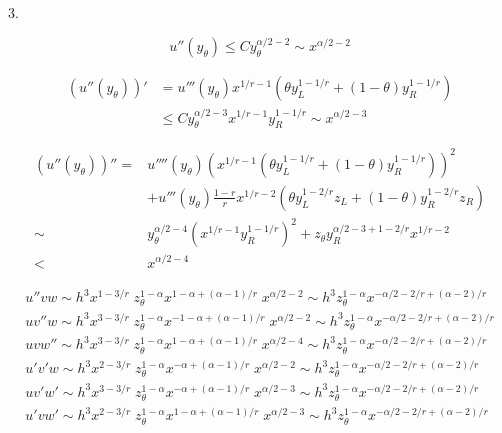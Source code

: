 \documentclass{ctexart}
\theoremstyle{definition}
\theoremstyle{remark}
\numberwithin{equation}{section}
\begin{document}
3.

\begin{equation}
    u''(y_\theta) \le C y_\theta^{\alpha/2-2} \sim x^{\alpha/2-2}
\end{equation}


\begin{equation}
    \begin{aligned}
        (u''(y_\theta))' & = u'''(y_\theta) x^{1/r-1}(\theta y_L^{1-1/r} + (1-\theta) y_R^{1-1/r}) \\
                         & \le C y_\theta^{\alpha/2-3}x^{1/r-1} y_R^{1-1/r} \sim x^{\alpha/2-3}
    \end{aligned}
\end{equation}

\begin{equation}
    \begin{aligned}
        (u''(y_\theta))'' = & u''''(y_\theta) (x^{1/r-1}(\theta y_L^{1-1/r} + (1-\theta) y_R^{1-1/r}))^2                  \\
                            & + u'''(y_\theta)\frac{1-r}{r} x^{1/r-2}(\theta y_L^{1-2/r}z_L + (1-\theta) y_R^{1-2/r}z_R)  \\
        \sim                & y_\theta^{\alpha/2-4} (x^{1/r-1} y_R^{1-1/r})^2 + z_\theta y_R^{\alpha/2-3 +1-2/r}x^{1/r-2} \\
        <                   & x^{\alpha/2-4}
    \end{aligned}
\end{equation}


\begin{gather}
    u''vw \sim h^3 x^{1-3/r} \; z_\theta^{1-\alpha} x^{1-\alpha + (\alpha-1)/r}\; x^{\alpha/2-2}
    \sim h^3 z_\theta^{1-\alpha} x^{-\alpha/2-2/r+(\alpha-2)/r}   \\
    uv''w \sim h^3 x^{3-3/r} \; z_\theta^{1-\alpha} x^{-1-\alpha + (\alpha-1)/r} \; x^{\alpha/2-2}
    \sim h^3z_\theta^{1-\alpha}x^{-\alpha/2-2/r+(\alpha-2)/r}  \\
    uvw'' \sim h^3 x^{3-3/r} \; z_\theta^{1-\alpha} x^{1-\alpha + (\alpha-1)/r} \; x^{\alpha/2-4}
    \sim h^3z_\theta^{1-\alpha}x^{-\alpha/2-2/r+(\alpha-2)/r}   \\
    u'v'w \sim h^3 x^{2-3/r}\; z_\theta^{1-\alpha} x^{-\alpha + (\alpha-1)/r} \; x^{\alpha/2-2}
    \sim h^3z_\theta^{1-\alpha}x^{-\alpha/2-2/r+(\alpha-2)/r}   \\
    uv'w' \sim h^3 x^{3-3/r} \; z_\theta^{1-\alpha} x^{-\alpha + (\alpha-1)/r} \; x^{\alpha/2-3}
    \sim h^3z_\theta^{1-\alpha}x^{-\alpha/2-2/r+(\alpha-2)/r}   \\
    u'vw' \sim h^3 x^{2-3/r}\;  z_\theta^{1-\alpha} x^{1-\alpha + (\alpha-1)/r} \; x^{\alpha/2-3}
    \sim h^3z_\theta^{1-\alpha}x^{-\alpha/2-2/r+(\alpha-2)/r}
\end{gather}
\end{document}
